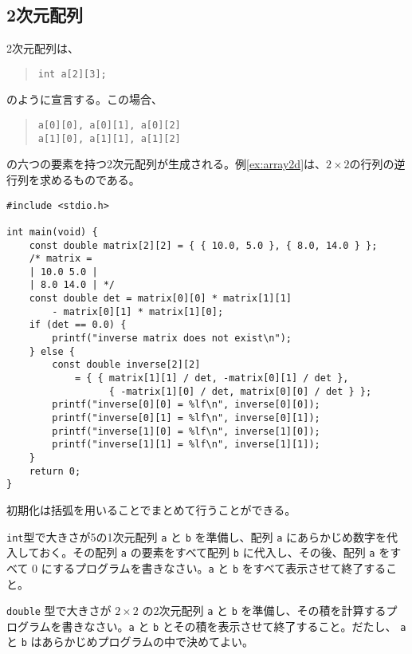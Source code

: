 \subsection{2次元配列}
2次元配列は、
\begin{quote}
    \begin{verbatim}
int a[2][3];
\end{verbatim}
\end{quote}
のように宣言する。この場合、
\begin{quote}
    \begin{verbatim}
a[0][0], a[0][1], a[0][2]
a[1][0], a[1][1], a[1][2]
\end{verbatim}
\end{quote}
の六つの要素を持つ2次元配列が生成される。例\ref{ex:array2d}は、\(2 \times 2\)の行列の逆行列を求めるものである。
\begin{reidai}\label{ex:array2d}
    \begin{verbatim}
#include <stdio.h>

int main(void) {
    const double matrix[2][2] = { { 10.0, 5.0 }, { 8.0, 14.0 } };
    /* matrix =
    | 10.0 5.0 |
    | 8.0 14.0 | */
    const double det = matrix[0][0] * matrix[1][1]
        - matrix[0][1] * matrix[1][0];
    if (det == 0.0) {
        printf("inverse matrix does not exist\n");
    } else {
        const double inverse[2][2]
            = { { matrix[1][1] / det, -matrix[0][1] / det },
                  { -matrix[1][0] / det, matrix[0][0] / det } };
        printf("inverse[0][0] = %lf\n", inverse[0][0]);
        printf("inverse[0][1] = %lf\n", inverse[0][1]);
        printf("inverse[1][0] = %lf\n", inverse[1][0]);
        printf("inverse[1][1] = %lf\n", inverse[1][1]);
    }
    return 0;
}
\end{verbatim}
\end{reidai}
初期化は括弧を用いることでまとめて行うことができる。

\begin{renshuu}\label{prob:3-1}
    \texttt{int}型で大きさが5の1次元配列 \texttt{a} と \texttt{b} を準備し、配列 \texttt{a} にあらかじめ数字を代入しておく。その配列 \texttt{a} の要素をすべて配列 \texttt{b} に代入し、その後、配列 \texttt{a} をすべて 0 にするプログラムを書きなさい。\texttt{a} と \texttt{b} をすべて表示させて終了すること。
\end{renshuu}

\begin{renshuu}\label{prob:3-2}
    \texttt{double} 型で大きさが \(2\times2\) の2次元配列 \texttt{a} と \texttt{b} を準備し、その積を計算するプログラムを書きなさい。\texttt{a} と \texttt{b} とその積を表示させて終了すること。だたし、 \texttt{a} と \texttt{b} はあらかじめプログラムの中で決めてよい。
\end{renshuu}

